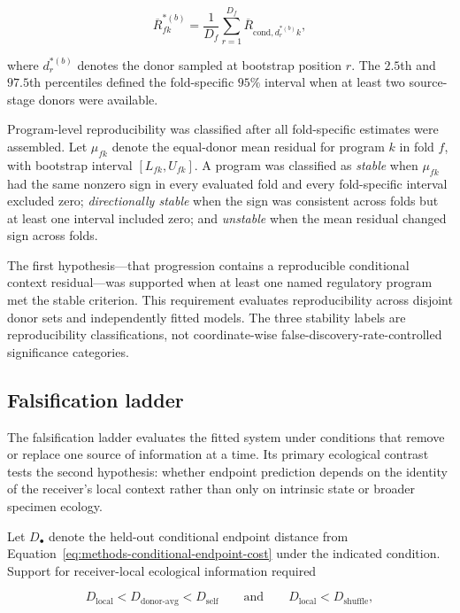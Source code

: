 \begin{equation}
\overline{R}_{fk}^{\ast(b)}
=
\frac{1}{D_f}
\sum_{r=1}^{D_f}
\overline{R}_{\mathrm{cond},d_r^{\ast(b)}k},
\label{eq:methods-donor-bootstrap}
\end{equation}

where \(d_r^{\ast(b)}\) denotes the donor sampled at bootstrap position \(r\).
The \(2.5\)th and \(97.5\)th percentiles defined the fold-specific
\(95\%\) interval when at least two source-stage donors were available.

Program-level reproducibility was classified after all fold-specific estimates
were assembled. Let \(\mu_{fk}\) denote the equal-donor mean residual for
program \(k\) in fold \(f\), with bootstrap interval
\([L_{fk},U_{fk}]\). A program was classified as \emph{stable} when
\(\mu_{fk}\) had the same nonzero sign in every evaluated fold and every
fold-specific interval excluded zero; \emph{directionally stable} when the sign
was consistent across folds but at least one interval included zero; and
\emph{unstable} when the mean residual changed sign across folds.

The first hypothesis---that progression contains a reproducible conditional
context residual---was supported when at least one named regulatory program met
the stable criterion. This requirement evaluates reproducibility across
disjoint donor sets and independently fitted models. The three stability labels
are reproducibility classifications, not coordinate-wise
false-discovery-rate-controlled significance categories.

\subsection{Falsification ladder}
\label{sec:methods-context-controls}
\label{sec:methods-model-controls}

The falsification ladder evaluates the fitted system under conditions that
remove or replace one source of information at a time. Its primary ecological
contrast tests the second hypothesis: whether endpoint prediction depends on
the identity of the receiver's local context rather than only on intrinsic
state or broader specimen ecology.

Let \(D_{\bullet}\) denote the held-out conditional endpoint distance from
Equation~\ref{eq:methods-conditional-endpoint-cost} under the indicated
condition. Support for receiver-local ecological information required

\begin{equation}
D_{\mathrm{local}}
<
D_{\mathrm{donor\text{-}avg}}
<
D_{\mathrm{self}}
\qquad\text{and}\qquad
D_{\mathrm{local}}
<
D_{\mathrm{shuffle}},
\label{eq:h1-local}
\end{equation}

